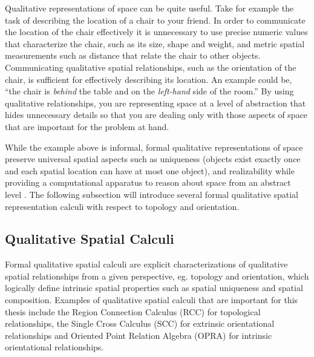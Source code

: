 \documentclass[12pt]{ucthesis}
\begin{document}
Qualitative representations of space can be quite useful. Take for example the task of describing the location of a chair to your friend. 
In order to communicate the location of the chair effectively it is unnecessary to use precise numeric values that characterize the chair, such as its size, shape and weight, and metric spatial measurements such as distance that relate the chair to other objects. Communicating qualitative spatial relationships, such as the orientation of the chair, is sufficient for effectively describing its location. An example could be, ``the chair is \emph{behind} the table and on the \emph{left-hand} side of the room.'' By using qualitative relationships, you are representing space at a level of abstraction that hides unnecessary details so that you are dealing only with those aspects of space that are important for the problem at hand.

While the example above is informal, formal qualitative representations of space preserve universal spatial aspects such as uniqueness (objects exist exactly once and each spatial location can have at most one object), and realizability while providing a computational apparatus to reason about space from an abstract level \cite{freksa1991qsr}. The following subsection will introduce several formal qualitative spatial representation calculi with respect to topology and orientation. 


\subsection{Qualitative Spatial Calculi}
Formal qualitative spatial calculi are explicit characterizations of qualitative spatial relationships from a given perspective, eg. topology and orientation, which logically define intrinsic spatial properties such as spatial uniqueness and spatial composition. Examples of qualitative spatial calculi that are important for this thesis include the Region Connection Calculus (RCC) \cite{Randell92aspatial} for topological relationships, the Single Cross Calculus (SCC) for extrinsic orientational relationships \cite{Freksa92usingorientation} and Oriented Point Relation Algebra (OPRA) \cite{Moratz} for intrinsic orientational relationships.
\end{document}
